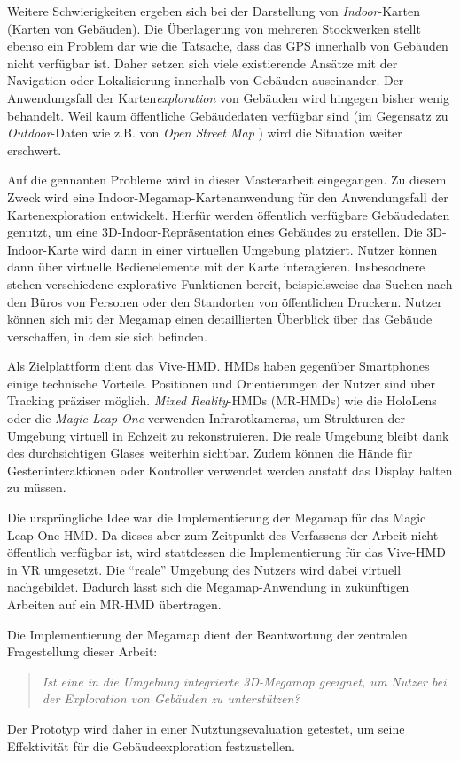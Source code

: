 Weitere Schwierigkeiten ergeben sich bei der Darstellung von \emph{Indoor}-Karten (Karten von Gebäuden).
Die Überlagerung von mehreren Stockwerken stellt ebenso ein Problem dar wie die Tatsache, dass das GPS innerhalb von Gebäuden nicht verfügbar ist.
Daher setzen sich viele existierende Ansätze mit der Navigation oder Lokalisierung innerhalb von Gebäuden auseinander.
Der Anwendungsfall der Karten\emph{exploration} von Gebäuden wird hingegen bisher wenig behandelt.
Weil kaum öffentliche Gebäudedaten verfügbar sind (im Gegensatz zu \emph{Outdoor}-Daten wie z.B. von \emph{Open Street Map} \parencite{OpenStreetMapFoundation2018}) wird die Situation weiter erschwert.

Auf die gennanten Probleme wird in dieser Masterarbeit eingegangen.
Zu diesem Zweck wird eine Indoor-Megamap-Kartenanwendung für den Anwendungsfall der Kartenexploration entwickelt.
Hierfür werden öffentlich verfügbare Gebäudedaten genutzt, um eine 3D-Indoor-Repräsentation eines Gebäudes zu erstellen.
Die 3D-Indoor-Karte wird dann in einer virtuellen Umgebung platziert.
Nutzer können dann über virtuelle Bedienelemente mit der Karte interagieren.
Insbesodnere stehen verschiedene explorative Funktionen bereit, beispielsweise das Suchen nach den Büros von Personen oder den Standorten von öffentlichen Druckern.
Nutzer können sich mit der Megamap einen detaillierten Überblick über das Gebäude verschaffen, in dem sie sich befinden.

Als Zielplattform dient das Vive-HMD.
HMDs haben gegenüber Smartphones einige technische Vorteile.
Positionen und Orientierungen der Nutzer sind über Tracking präziser möglich.
\emph{Mixed Reality}-HMDs (MR-HMDs) wie die HoloLens oder die \emph{Magic Leap One} \parencite{MagicLeap2018} verwenden Infrarotkameras, um Strukturen der Umgebung virtuell in Echzeit zu rekonstruieren.
Die reale Umgebung bleibt dank des durchsichtigen Glases weiterhin sichtbar.
Zudem können die Hände für Gesteninteraktionen oder Kontroller verwendet werden anstatt das Display halten zu müssen.

Die ursprüngliche Idee war die Implementierung der Megamap für das Magic Leap One HMD.
Da dieses aber zum Zeitpunkt des Verfassens der Arbeit nicht öffentlich verfügbar ist, wird stattdessen die Implementierung für das Vive-HMD in VR umgesetzt.
Die \enquote{reale} Umgebung des Nutzers wird dabei virtuell nachgebildet.
Dadurch lässt sich die Megamap-Anwendung in zukünftigen Arbeiten auf ein MR-HMD übertragen.

Die Implementierung der Megamap dient der Beantwortung der zentralen Fragestellung dieser Arbeit:
\begin{quote}
    \itshape
    Ist eine in die Umgebung integrierte 3D-Megamap geeignet, um Nutzer bei der Exploration von Gebäuden zu unterstützen?
\end{quote}
Der Prototyp wird daher in einer Nutztungsevaluation getestet, um seine Effektivität für die Gebäudeexploration festzustellen.

